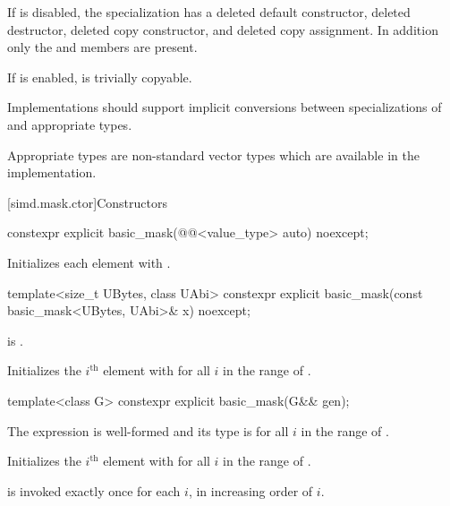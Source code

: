 If  is disabled, the specialization has a
deleted default constructor, deleted destructor, deleted copy constructor, and
deleted copy assignment.
In addition only the  and  members are
present.

If  is enabled,
 is trivially copyable.

\pnum
\recommended Implementations should support implicit conversions between
specializations of  and appropriate  types.
\begin{note}
Appropriate types are non-standard vector types which are available in the
implementation.
\end{note}

[simd.mask.ctor]{Constructors}

\begin{itemdecl}
constexpr explicit basic_mask(@@<value_type> auto) noexcept;
\end{itemdecl}

\begin{itemdescr}
\pnum
\effects
Initializes each element with .
\end{itemdescr}

\begin{itemdecl}
template<size_t UBytes, class UAbi>
  constexpr explicit basic_mask(const basic_mask<UBytes, UAbi>& x) noexcept;
\end{itemdecl}

\begin{itemdescr}
\pnum
\constraints
{} is
.

\pnum
\effects
Initializes the $i^\text{th}$ element with  for all $i$ in the
range of .
\end{itemdescr}

\begin{itemdecl}
template<class G> constexpr explicit basic_mask(G&& gen);
\end{itemdecl}

\begin{itemdescr}
\pnum
\constraints
The expression  is
well-formed and its type is  for all $i$ in the range of
.

\pnum
\effects
Initializes the $i^\text{th}$ element with
 for all $i$ in
the range of .

\pnum
\remarks
{} is invoked exactly once for each $i$, in increasing order of $i$.
\end{itemdescr}

